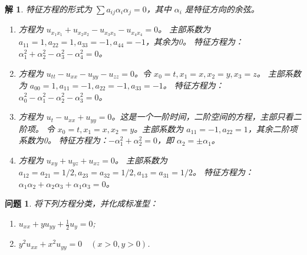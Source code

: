 \documentclass[12pt,a4paper]{article}
\newtheorem{problem}{问题}
\newtheorem*{solution}{解}
\begin{document}
	\begin{solution}
		特征方程的形式为 \(\sum a_{ij} \alpha_i \alpha_j = 0\)，其中 \(\alpha_i\) 是特征方向的余弦。
		\begin{enumerate}[(1)]
			\item 方程为 \(u_{x_1x_1} + u_{x_2x_2} - u_{x_3x_3} - u_{x_4x_4} = 0\)。
			主部系数为 \(a_{11}=1, a_{22}=1, a_{33}=-1, a_{44}=-1\)，其余为0。
			特征方程为：\(\alpha_1^2 + \alpha_2^2 - \alpha_3^2 - \alpha_4^2 = 0\)。
			\item 方程为 \(u_{tt} - u_{xx} - u_{yy} - u_{zz} = 0\)。令 \(x_0=t, x_1=x, x_2=y, x_3=z\)。
			主部系数为 \(a_{00}=1, a_{11}=-1, a_{22}=-1, a_{33}=-1\)。
			特征方程为：\(\alpha_0^2 - \alpha_1^2 - \alpha_2^2 - \alpha_3^2 = 0\)。
			\item 方程为 \(u_t - u_{xx} + u_{yy} = 0\)。这是一个一阶时间，二阶空间的方程，主部只看二阶项。
			令 \(x_0=t, x_1=x, x_2=y\)。主部系数为 \(a_{11}=-1, a_{22}=1\)，其余二阶项系数为0。
			特征方程为：\(-\alpha_1^2 + \alpha_2^2 = 0\)，即 \(\alpha_2 = \pm \alpha_1\)。
			\item 方程为 \(u_{xy} + u_{yz} + u_{xz} = 0\)。
			主部系数为 \(a_{12}=a_{21}=1/2, a_{23}=a_{32}=1/2, a_{13}=a_{31}=1/2\)。
			特征方程为：\(\alpha_1\alpha_2 + \alpha_2\alpha_3 + \alpha_1\alpha_3 = 0\)。
		\end{enumerate}
	\end{solution}
	
	\newpage
	
	\begin{problem}
		将下列方程分类，并化成标准型：
		\begin{enumerate}[(1)]
			\item \( u_{xx} + y u_{yy} + \frac{1}{2} u_y = 0 \);
			\item \( y^2 u_{xx} + x^2 u_{yy} = 0 \quad (x>0, y>0) \).
		\end{enumerate}
	\end{problem}
	
\end{document}
